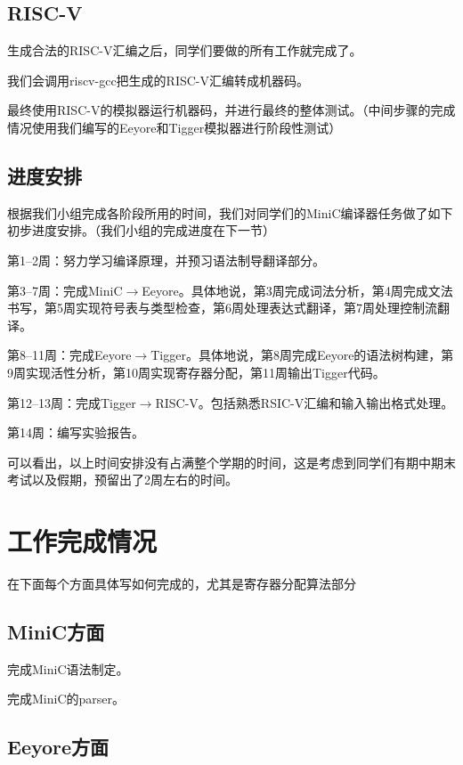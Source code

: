 \documentclass[a4paper]{ctexart}
\begin{document}
\subsection{RISC-V}

生成合法的RISC-V汇编之后，同学们要做的所有工作就完成了。

我们会调用riscv-gcc把生成的RISC-V汇编转成机器码。

最终使用RISC-V的模拟器运行机器码，并进行最终的整体测试。（中间步骤的完成情况使用我们编写的Eeyore和Tigger模拟器进行阶段性测试）

\subsection{进度安排}

根据我们小组完成各阶段所用的时间，我们对同学们的MiniC编译器任务做了如下初步进度安排。（我们小组的完成进度在下一节）

第1--2周：努力学习编译原理，并预习语法制导翻译部分。

第3--7周：完成MiniC$\rightarrow$Eeyore。具体地说，第3周完成词法分析，第4周完成文法书写，第5周实现符号表与类型检查，第6周处理表达式翻译，第7周处理控制流翻译。

第8--11周：完成Eeyore$\rightarrow$Tigger。具体地说，第8周完成Eeyore的语法树构建，第9周实现活性分析，第10周实现寄存器分配，第11周输出Tigger代码。

第12--13周：完成Tigger$\rightarrow$RISC-V。包括熟悉RSIC-V汇编和输入输出格式处理。

第14周：编写实验报告。

可以看出，以上时间安排没有占满整个学期的时间，这是考虑到同学们有期中期末考试以及假期，预留出了2周左右的时间。

\newpage
\section{工作完成情况}

{\color{red}在下面每个方面具体写如何完成的，尤其是寄存器分配算法部分}

\subsection{MiniC方面}

完成MiniC语法制定。

完成MiniC的parser。

\subsection{Eeyore方面}
\end{document}
